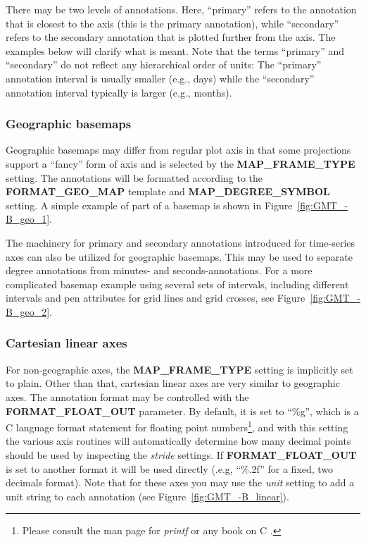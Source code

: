 There may be two levels of annotations.  Here, ``primary'' refers to the annotation
that is closest to the axis (this is the primary annotation), while ``secondary'' refers to the secondary
annotation that is plotted further from the axis.  The examples below
will clarify what is meant.  Note that the terms ``primary'' and ``secondary'' do not reflect any hierarchical
order of units: The ``primary'' annotation interval is usually smaller (e.g., days) while the
``secondary'' annotation interval typically is larger (e.g., months).

\subsubsection{Geographic basemaps}

Geographic basemaps may differ from regular plot axis in that some projections support a
``fancy'' form of axis and is selected by the \textbf{MAP\_FRAME\_TYPE} setting.  The annotations
will be formatted according to the \textbf{FORMAT\_GEO\_MAP} template and \textbf{MAP\_DEGREE\_SYMBOL}
setting.  A simple example of part of a basemap is shown in Figure~\ref{fig:GMT_-B_geo_1}.


The machinery for primary and secondary annotations introduced for time-series axes can
also be utilized for geographic basemaps.  This may be used to separate
degree annotations from minutes- and seconds-annotations.  For a more complicated basemap
example using several sets of intervals, including different intervals and pen attributes
for grid lines and grid crosses, see Figure~\ref{fig:GMT_-B_geo_2}.



\subsubsection{Cartesian linear axes}

For non-geographic axes, the \textbf{MAP\_FRAME\_TYPE} setting is implicitly set to plain.  Other than that,
cartesian linear axes are very similar to geographic axes.  The annotation format may be controlled with
the \textbf{FORMAT\_FLOAT\_OUT} parameter.  By default, it is set to ``\%g'', which is a C language format statement
for floating point numbers\footnote{Please consult the man page for \emph{printf} or any book on C .},
and with this setting the various axis routines will automatically determine
how many decimal points should be used by inspecting the \emph{stride} settings.  If \textbf{FORMAT\_FLOAT\_OUT} is set
to another format it will be used directly (.e.g, ``\%.2f'' for a fixed, two decimals format).
Note that for these axes you may use the \emph{unit} setting to
add a unit string to each annotation (see Figure~\ref{fig:GMT_-B_linear}).

